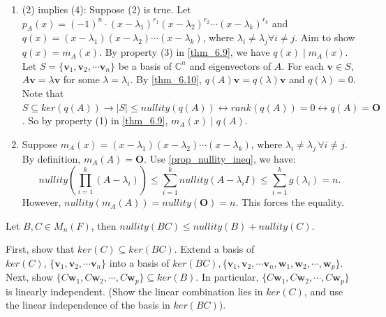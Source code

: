 \documentclass[12pt]{article}
\begin{document}
\begin{pfbox}
\begin{enumerate}
    \item (2) implies (4): Suppose (2) is true. Let $p_A(x)=(-1)^n\cdot(x-\lambda_1)^{r_1}(x-\lambda_2)^{r_2}\cdots(x-\lambda_k)^{r_k}$ and $q(x)=(x-\lambda_1)(x-\lambda_2)\cdots (x-\lambda_k)$, where $\lambda_i\neq \lambda_j \forall i\ne j$.
    Aim to show $q(x)=m_A(x)$. By property (3) in \eqref{thm_6.9}, we have $q(x)\mid m_A(x)$.
    Let $S = \{\mathbf{v}_1, \mathbf{v}_2, \cdots \mathbf{v}_n\}$ be a basis of $\mathbb{C}^n$ and eigenvectors of $A$.
    For each $\mathbf{v}\in S$, $A\mathbf{v}=\lambda\mathbf{v}$ for some $\lambda=\lambda_i$.
    By \eqref{thm_6.10}, $q(A)\mathbf{v}=q(\lambda)\mathbf{v}$ and $q(\lambda)=0$.
    Note that $S\subseteq ker(q(A)) \rightarrow |S|\le nullity(q(A)) \leftrightarrow rank(q(A))=0 \leftrightarrow q(A)=\mathbf{O}$.
    So by property (1) in \eqref{thm_6.9}, $m_A(x)\mid q(A).$ 

    \item Suppose $m_A(x)=(x-\lambda_1)(x-\lambda_2)\cdots (x-\lambda_k)$, where $\lambda_i\neq \lambda_j\, \forall i\ne j$.
    By definition, $m_A(A)=\mathbf{O}.$ Use \eqref{prop_nullity_ineq}, we have:
    \[nullity(\prod_{i=1}^{k}(A-\lambda_i))\leq \sum_{i=1}^{k}nullity(A-\lambda_i I)\le \sum_{i=1}^{k}g(\lambda_i)=n.\]
    However, $nullity(m_A(A))=nullity(\mathbf{O})=n$. This forces the equality.
\end{enumerate}
\end{pfbox}

\begin{proposition}
    Let $B,C\in M_n(F)$, then $nullity(BC)\le nullity(B)+nullity(C)$.
    \label{prop_nullity_ineq}
\end{proposition}

\begin{pfbox}
    First, show that $ker(C)\subseteq ker(BC)$. Extend a basis of $ker(C),\,\{\mathbf{v}_1, \mathbf{v}_2, \cdots \mathbf{v}_n\}$ into a basis of $ker(BC), \{\mathbf{v}_1, \mathbf{v}_2, \cdots \mathbf{v}_n, \mathbf{w}_1,\mathbf{w}_2,\cdots, \mathbf{w}_p\}$.\\
    Next, show $\{C\mathbf{w}_1,C\mathbf{w}_2,\cdots, C\mathbf{w}_p\}\subseteq ker(B)$.
    In particular,  $\{C\mathbf{w}_1,C\mathbf{w}_2,\cdots, C\mathbf{w}_p\}$ is linearly independent. (Show the linear combination lies in $ker(C)$, and use the linear independence of the basis in $ker(BC)$).
\end{pfbox}
\end{document}
